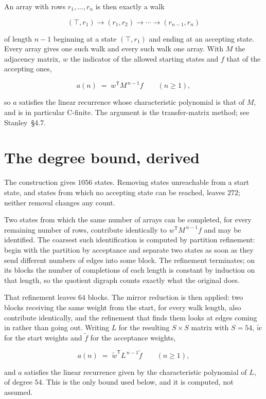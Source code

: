 \documentclass[11pt]{article}
\theoremstyle{definition}
\begin{document}
An array with rows $r_1,\dots,r_n$ is then exactly a walk

\[(\top,r_1) \to (r_1,r_2) \to \cdots \to (r_{n-1},r_n)\]

of length $n-1$ beginning at a state $(\top,r_1)$ and ending at an accepting state. Every array gives one such walk and every such walk one array. With $M$ the adjacency matrix, $w$ the indicator of the allowed starting states and $f$ that of the accepting ones,

\[a(n) \;=\; w^{\mathsf T} M^{\,n-1} f \qquad (n \ge 1),\]

so $a$ satisfies the linear recurrence whose characteristic polynomial is that of $M$, and is in particular C-finite. The argument is the transfer-matrix method; see Stanley~\S4.7.

\section{The degree bound, derived}

The construction gives $1056$ states. Removing states unreachable from a start state, and states from which no accepting state can be reached, leaves $272$; neither removal changes any count.

Two states from which the same number of arrays can be completed, for every remaining number of rows, contribute identically to $w^{\mathsf T}M^{\,n-1}f$ and may be identified. The coarsest such identification is computed by partition refinement: begin with the partition by acceptance and separate two states as soon as they send different numbers of edges into some block. The refinement terminates; on its blocks the number of completions of each length is constant by induction on that length, so the quotient digraph counts exactly what the original does.

That refinement leaves $64$ blocks. The mirror reduction is then applied: two blocks receiving the same weight from the start, for every walk length, also contribute identically, and the refinement that finds them looks at edges coming in rather than going out. Writing $L$ for the resulting $S \times S$ matrix with $S = 54$, $\tilde w$ for the start weights and $\tilde f$ for the acceptance weights,

\[a(n) \;=\; \tilde w^{\mathsf T} L^{\,n-1} \tilde f \qquad (n \ge 1),\]

and $a$ satisfies the linear recurrence given by the characteristic polynomial of $L$, of degree $54$. This is the only bound used below, and it is computed, not assumed.
\end{document}
